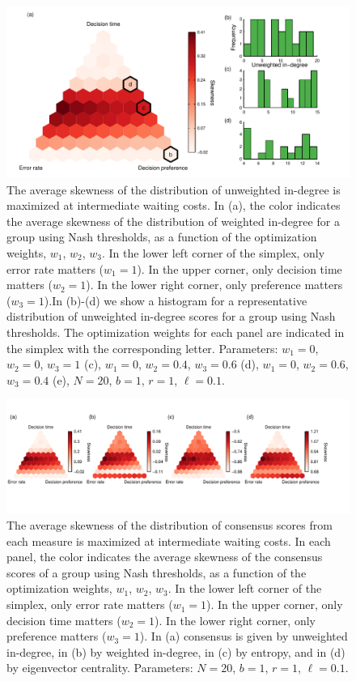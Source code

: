 \documentclass{article}
\begin{document}
\begin{figure}[ht]
\includegraphics[width=6.83in]{skewness_histograms.pdf}
\caption{\label{histograms}  The average skewness of the distribution of unweighted in-degree is maximized at intermediate waiting costs. In (a), the color indicates the average skewness of the distribution of weighted in-degree for a group using Nash thresholds, as a function of the optimization weights, $w_1$, $w_2$, $w_3$. In the lower left corner of the simplex, only error rate matters ($w_1=1$).  In the upper corner, only decision time matters ($w_2=1$).  In the lower right corner, only preference matters ($w_3=1$).In (b)-(d) we show a histogram for a representative distribution of unweighted in-degree scores for a group using Nash thresholds. The optimization weights for each panel are indicated in the simplex with the corresponding letter.  Parameters: $w_1=0$, $w_2=0$, $w_3=1$ (c), $w_1=0$, $w_2=0.4$, $w_3=0.6$ (d), $w_1=0$, $w_2=0.6$, $w_3=0.4$ (e),  $N=20$, $b=1$, $r=1$, $\ell=0.1$.}
\end{figure}

\begin{figure}[ht]
\includegraphics[width=6.83in]{multi_skewness.pdf}
\caption{\label{supp_skewness} The average skewness of the distribution of consensus scores from each measure is maximized at intermediate waiting costs.  In each panel, the color indicates the average skewness of the consensus scores of a group using Nash thresholds, as a function of the optimization weights, $w_1$, $w_2$, $w_3$. In the lower left corner of the simplex, only error rate matters ($w_1=1$).  In the upper corner, only decision time matters ($w_2=1$).  In the lower right corner, only preference matters ($w_3=1$). In (a) consensus is given by unweighted in-degree, in (b) by weighted in-degree, in (c) by entropy, and in (d) by eigenvector centrality. Parameters: $N=20$, $b=1$, $r=1$, $\ell=0.1$.} 
\end{figure}




\end{document}
